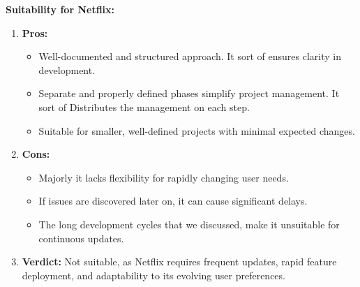 \documentclass[a4paper,10pt,twoside]{article}
\begin{document}
\newpage
\textbf{Suitability for Netflix:}
\begin{enumerate}
    \item \textbf{Pros:}
    \begin{itemize}
        \item Well-documented and structured approach. It sort of ensures clarity in development.
        \item Separate and properly defined phases simplify project management. It sort of Distributes the management on each step.
        \item Suitable for smaller, well-defined projects with minimal expected changes.
    \end{itemize}
    \item \textbf{Cons:}
    \begin{itemize}
        \item Majorly it lacks flexibility for rapidly changing user needs.
        \item If issues are discovered later on, it can cause significant delays.
        \item The long development cycles that we discussed, make it unsuitable for continuous updates.
    \end{itemize}
    \item \textbf{Verdict:} Not suitable, as Netflix requires frequent updates, rapid feature deployment, and adaptability to its evolving user preferences.
\end{enumerate}
\end{document}
